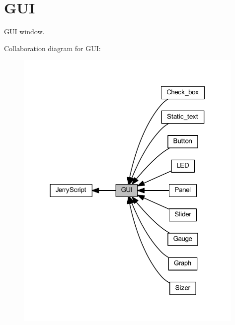 \section{G\+UI}
\label{group___g_u_i}


G\+UI window.  


Collaboration diagram for G\+UI\+:
\nopagebreak
\begin{figure}[H]
\begin{center}
\leavevmode
\includegraphics[width=313pt]{group___g_u_i}
\end{center}
\end{figure}
